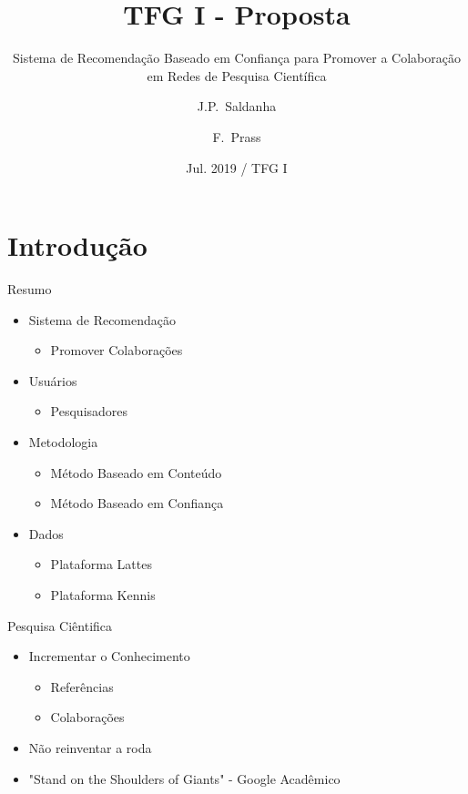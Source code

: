 \documentclass{beamer}
\title
  [Sistema de Recomendação Baseado em Confiança para Promover a Colaboração em Redes de Pesquisa Científica]
  {TFG I - Proposta}
\subtitle{Sistema de Recomendação Baseado em Confiança para Promover a Colaboração em Redes de Pesquisa Científica}
\author[João Pedro Raskopf, Fernando Prass]{J.P.~Saldanha\inst{1} \and F.~Prass\inst{1}}
\institute[Some University]
{
  \inst{1}%
  Ciência da Computação\\
  Universidade Fransicana
}
\date[Proposta TFG]{Jul. 2019 / TFG I}
\begin{document}
\begin{frame}
  \titlepage
\end{frame}

\section{Introdução}

\begin{frame}{Resumo}{}
  
  \begin{itemize}
    \item Sistema de Recomendação
    \begin{itemize}
      \item Promover Colaborações
    \end{itemize}
  \end{itemize}

  \begin{itemize}
    \item Usuários
    \begin{itemize}
      \item Pesquisadores
    \end{itemize}
  \end{itemize}
  
  \begin{itemize}
    \item Metodologia
    \begin{itemize}
      \item Método Baseado em Conteúdo
      \item Método Baseado em Confiança
    \end{itemize}
  \end{itemize}

  \begin{itemize}
    \item Dados
    \begin{itemize}
      \item Plataforma Lattes
      \item Plataforma Kennis
    \end{itemize}
  \end{itemize}

\end{frame} 

\begin{frame}{Pesquisa Ciêntifica}{}
  
  \begin{itemize}
    \item Incrementar o Conhecimento
    
    \begin{itemize}
      \item Referências
      \item Colaborações
    \end{itemize}
    
    \item Não reinventar a roda
    \item "Stand on the Shoulders of Giants" - Google Acadêmico
  \end{itemize}

\end{frame}
\end{document}
